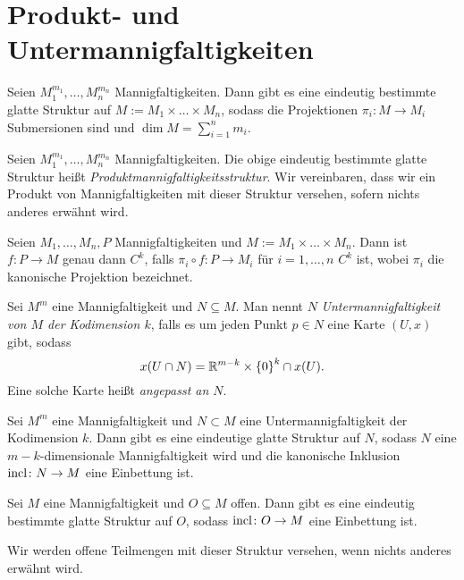 \section{Produkt- und Untermannigfaltigkeiten}
\label{sec:prumfk}

\begin{proposition}
  Seien $M_1^{m_1},\dots,M_n^{m_n}$ Mannigfaltigkeiten. Dann gibt es
  eine eindeutig bestimmte glatte Struktur auf $M :=
  M_1\times\dots\times M_n$, sodass die Projektionen $\pi_i \colon M
  \to M_i$ Submersionen sind und $\dim M = \sum_{i=1}^n m_i$.
\end{proposition}

\begin{definition}
  Seien $M_1^{m_1},\dots,M_n^{m_n}$ Mannigfaltigkeiten. Die obige
  eindeutig bestimmte glatte  Struktur heißt
  \emph{Produktmannigfaltigkeitsstruktur}. Wir vereinbaren, dass wir
  ein Produkt von Mannigfaltigkeiten mit dieser Struktur versehen,
  sofern nichts anderes erwähnt wird.
\end{definition}

\begin{proposition}
  Seien $M_1,\dots,M_n,P$ Mannigfaltigkeiten und $M :=
  M_1\times\dots\times M_n$. Dann ist $f\colon P \to M$ genau dann
  $C^k$, falls $\pi_i\circ f \colon P \to M_i$ für $i=1,\dots,n$ $C^k$
  ist, wobei $\pi_i$ die kanonische Projektion bezeichnet.
\end{proposition}

\begin{definition}
  Sei $M^m$ eine Mannigfaltigkeit und $N \subseteq M$. 
  Man nennt $N$ \emph{Untermannigfaltigkeit von $M$ der Kodimension
    $k$}, falls es um jeden Punkt $p\in N$ eine Karte $(U,x)$ gibt, sodass
  \begin{equation*}
    x(U\cap N) = \mathbb{R}^{m-k}\times\left\lbrace 0 \right\rbrace^{k} \cap x(U).
  \end{equation*}
  Eine solche Karte heißt \emph{angepasst an $N$}.
\end{definition}

\begin{proposition}
  Sei $M^m$ eine Mannigfaltigkeit und $N\subset M$ eine
  Untermannigfaltigkeit der Kodimension $k$. Dann gibt es eine
  eindeutige glatte Struktur auf $N$, sodass $N$ eine
  $m-k$-dimensionale Mannigfaltigkeit wird und die kanonische
  Inklusion $\operatorname{incl}\colon N \to M$ eine Einbettung ist.
\end{proposition}

\begin{korollar}
  Sei $M$ eine Mannigfaltigkeit und $O\subseteq M$ offen. Dann gibt es
  eine eindeutig bestimmte glatte Struktur auf $O$, sodass
  $\operatorname{incl}\colon O \to M$ eine Einbettung ist.

  Wir werden offene Teilmengen mit dieser Struktur versehen, wenn
  nichts anderes erwähnt wird.
\end{korollar}

